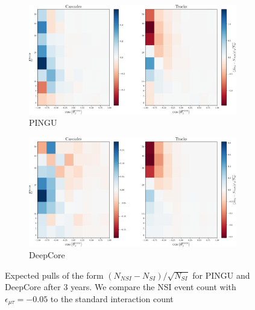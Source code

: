 \documentclass[draft=True]{revtex4-2}
\newcommand{\emt}{\ensuremath{\epsilon_{\mu\tau}}}
\begin{document}
\begin{figure}[t]
   \begin{center}
      \begin{subfigure}{0.49\textwidth}
         \includegraphics[width=1\textwidth]{figures/PINGU_event_pulls.pdf}
         \caption{PINGU}\label{fig:PINGU_event_pulls}
      \end{subfigure}
      \begin{subfigure}{0.49\textwidth}
         \includegraphics[width=1\textwidth]{figures/DC_event_pulls.pdf}
         \caption{DeepCore}\label{fig:DC_event_pulls}
      \end{subfigure}
   \end{center}
   \caption{Expected pulls of the form $(N_{NSI} - N_{SI})/\sqrt{N_{SI}}$ for PINGU and DeepCore after 3 years. We compare the NSI event count with $\emt=-0.05$
    to the standard interaction count}\label{fig:event_pulls} 
\end{figure}
\end{document}
